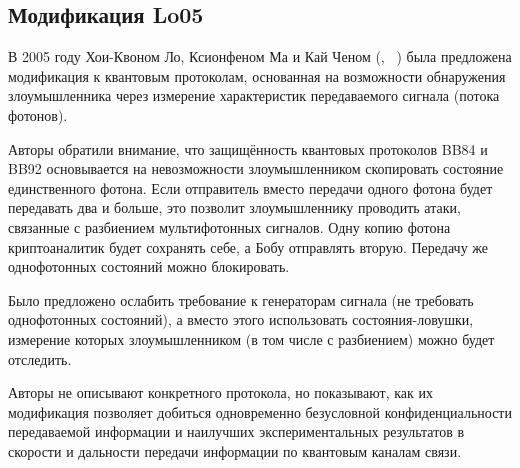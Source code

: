 \subsection{Модификация Lo05}

В 2005 году  Хои-Квоном Ло, Ксионфеном Ма и Кай Ченом (, ~\cite{Lo:Ma:Chen:2004, Lo:Ma:Chen:2005}) была предложена модификация к квантовым протоколам, основанная на возможности обнаружения злоумышленника через измерение характеристик передаваемого сигнала (потока фотонов).

Авторы обратили внимание, что защищённость квантовых протоколов BB84 и BB92 основывается на невозможности злоумышленником скопировать состояние единственного фотона. Если отправитель вместо передачи одного фотона будет передавать два и больше, это позволит злоумышленнику проводить атаки, связанные с разбиением мультифотонных сигналов. Одну копию фотона криптоаналитик будет сохранять себе, а Бобу отправлять вторую. Передачу же однофотонных состояний можно блокировать.

Было предложено ослабить требование к генераторам сигнала (не требовать однофотонных состояний), а вместо этого использовать состояния-ловушки, измерение которых злоумышленником (в том числе с разбиением) можно будет отследить.

Авторы не описывают конкретного протокола, но показывают, как их модификация позволяет добиться одновременно безусловной конфиденциальности передаваемой информации и наилучших экспериментальных результатов в скорости и дальности передачи информации по квантовым каналам связи.
